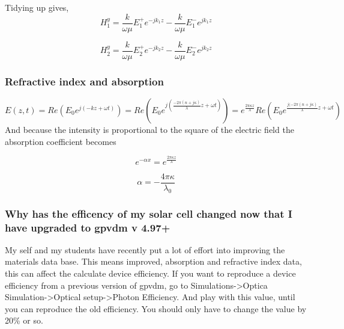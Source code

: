 \documentclass[11pt]{article}
\begin{document}
Tidying up gives,
\begin{equation}
H^{y}_{1}=\frac{k}{\omega \mu}E^{+}_{1} e^{-j k_1 z}-\frac{k}{\omega \mu} E^{-}_{1} e^{j k_1 z}
\end{equation}

\begin{equation}
H^{y}_{2}=\frac{k}{\omega \mu}E^{+}_{2} e^{-j k_2 z}-\frac{k}{\omega \mu} E^{-}_{2} e^{j k_2 z}
\end{equation}


\subsubsection{Refractive index and absorption}
\begin{equation}
E(z,t)=Re(E_0 e^{j(-kz+\omega t)})= Re(E_0 e^{j(\frac{-2 \pi (n+j\kappa)}{\lambda}z + \omega t)})=e^{\frac{2\pi\kappa z}{\lambda}}Re(E_0 e^{\frac{j(-2 \pi (n+j\kappa)}{\lambda}z +\omega t})
\end{equation}
And because the intensity is proportional to the square of the electric field the absorption coefficient becomes

\begin{equation}
e^{-\alpha x}=e^{\frac{2\pi\kappa z}{\lambda}}
\end{equation}

\begin{equation}
\alpha=-\frac{4\pi\kappa}{\lambda_0}
\end{equation}

\subsubsection{Why has the efficency of my solar cell changed now that I have upgraded to gpvdm v 4.97+}
My self and my students have recently put a lot of effort into improving the materials data base.  This means improved, absorption and refractive index data, this can affect the calculate device efficiency.  If you want to reproduce a device efficiency from a previous version of gpvdm, go to Simulations->Optica Simulation->Optical setup->Photon Efficiency. And play with this value, until you can reproduce the old efficiency.  You should only have to change the value by 20\% or so.
\end{document}
